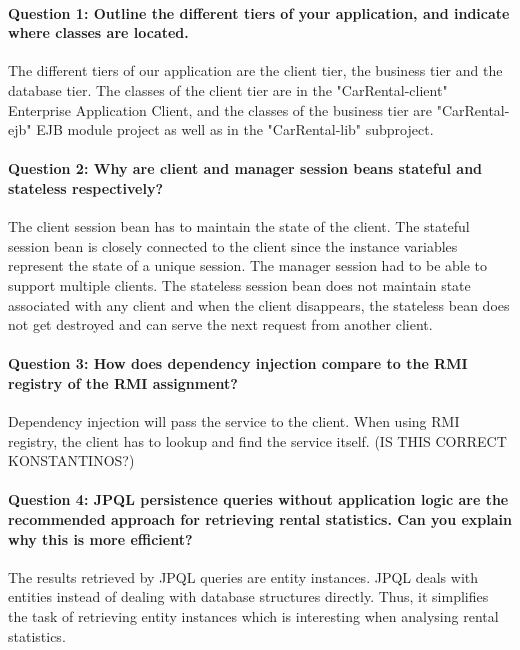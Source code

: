 \documentclass{ds-report}
\begin{document}
	\maketitle

	\paragraph{Question 1: Outline the different tiers of your application, and indicate where classes are located.\\} 
	The different tiers of our application are the client tier, the business tier and the database tier. 
	The classes of the client tier are in the "CarRental-client" Enterprise Application Client, and the classes of the business tier are "CarRental-ejb" EJB module project as well as in the "CarRental-lib" 
	subproject.
	
	\paragraph{Question 2: Why are client and manager session beans stateful and stateless respectively?\\} 
	The client session bean has to maintain the state of the client. The stateful session bean is closely connected to the client since the instance variables represent the state of a unique session. 
	The manager session had to be able to support multiple clients. 
	The stateless session bean does not maintain state associated with any client and when the client disappears, the stateless bean does not get destroyed and can serve the next request from another client.
	\paragraph{Question 3: How does dependency injection compare to the RMI registry of the RMI assignment?\\} 
	Dependency injection will pass the service to the client. When using RMI registry, the client has to lookup and find the service itself. (IS THIS CORRECT KONSTANTINOS?)
	\paragraph{Question 4: JPQL persistence queries without application logic are the recommended approach for retrieving rental statistics. Can you explain why this is more efficient?\\} 
	The results retrieved by JPQL queries are entity instances. JPQL deals with entities instead of dealing with database structures directly. Thus, it simplifies the task of retrieving entity instances which is interesting when analysing rental statistics.
	
\end{document}
